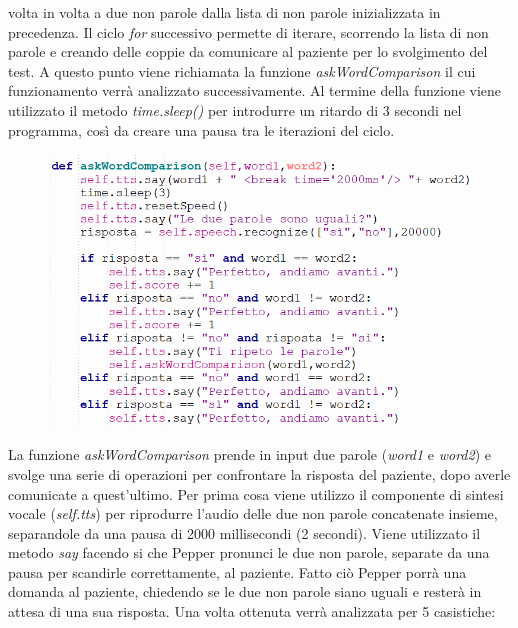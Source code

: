 \begin{sloppypar}
{volta in volta a due non parole dalla lista di non parole inizializzata in precedenza.\newline
Il ciclo \textit{for} successivo permette di iterare, scorrendo la lista di non parole e creando
delle coppie da comunicare al paziente per lo svolgimento del test.\newline
A questo punto viene richiamata la funzione \textit{askWordComparison} il cui funzionamento
verrà analizzato successivamente. Al termine della funzione viene
utilizzato il metodo \textit{time.sleep()} per introdurre un ritardo di 3 secondi nel programma,
così da creare una pausa tra le iterazioni del ciclo.
\begin{figure}[H]
\centering
\includegraphics[width=1\textwidth]{immagini/lrs4.png}
\end{figure}
\vspace{0.3cm}
La funzione \textit{askWordComparison} prende in input due parole (\textit{word1} e \textit{word2}) e
svolge una serie di operazioni per confrontare la risposta del paziente, dopo averle
comunicate a quest’ultimo.\newline
Per prima cosa viene utilizzo il componente di sintesi vocale (\textit{self.tts}) per
riprodurre l’audio delle due non parole concatenate insieme, separandole da una pausa
di 2000 millisecondi (2 secondi). Viene utilizzato il metodo \textit{say} facendo si che
Pepper pronunci le due non parole, separate da una pausa per scandirle correttamente,
al paziente.\newline
Fatto ciò Pepper porrà una domanda al paziente, chiedendo se le due
non parole siano uguali e resterà in attesa di una sua risposta.\newline
Una volta ottenuta verrà analizzata per 5 casistiche:
}
\end{sloppypar}
